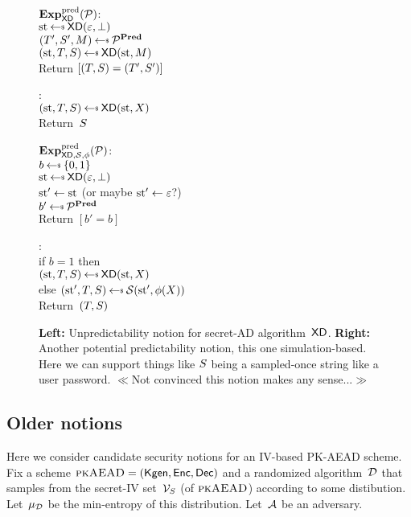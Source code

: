 

\begin{figure}[tbhp]
\begin{center}
{
 \underline{$\mathbf{Exp}^{\mathrm{pred}}_{\mathsf{XD}}{({\cal P})}$}:\\[2pt]
 $\st \getsr \mdalg(\emptystring,\bot)$\\
 $ (\umd',\rmd',M)\getsr\advP^{\predOracle}$\\
 $ (\st,\umd,\rmd) \getsr \mdalg(\st,M)$\\
 Return $[(T,S)=(T',S')]$

\medskip
 :\\[2pt]
 $(\st,\umd,\rmd) \getsr \mdalg(\st,X)$\\
 Return~$S$
}
{
\underline{$\mathbf{Exp}^{\mathrm{pred}}_{\mathsf{XD},{\mathcal S},\phi}{({\cal P})}$}:\\[2pt]
$b \getsr \bits$\\ 
$\st \getsr \mdalg(\emptystring,\bot)$\\
$\mathrm{st}' \gets \mathrm{st}$ (or maybe $\mathrm{st}'\gets\varepsilon$?)\\
$ b'\getsr\advP^{\predOracle}$\\
 Return $[b'=b]$ 

\medskip
 :\\[2pt]
 if $b=1$ then\\$(\st,\umd,\rmd) \getsr \mdalg(\st,X)$\\
 else $(\st',\umd,\rmd) \getsr \simulator(\st',\phi(X))$\\
 Return~$(T,S)$
 }
\caption{ {\bf Left:} Unpredictability notion for secret-AD algorithm~$\mathsf{XD}$. {\bf Right:} Another potential predictability notion, this one simulation-based.  Here we can support things like $S$ being a sampled-once string like a user password. $\ll$Not convinced this notion makes any sense...$\gg$}  
\label{fig:pred-notions}
\end{center}
\end{figure}
\fi

\subsection{Older notions}
Here we consider candidate security notions for an IV-based PK-AEAD scheme.  Fix a scheme $\textsc{pkAEAD}=(\mathsf{Kgen},{\mathsf{Enc}},{\mathsf{Dec}})$ and a randomized algorithm~${\cal D}$ that samples from the secret-IV set~$\mathcal{V}_S$ (of $\textsc{pkAEAD}$) according to some distibution.  Let~$\mu_{\cal D}$ be the min-entropy of this distribution.  Let~${\cal A}$ be an adversary.  

